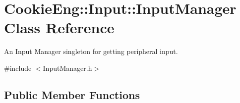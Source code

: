 \hypertarget{class_cookie_eng_1_1_input_1_1_input_manager}{}\section{Cookie\+Eng\+:\+:Input\+:\+:Input\+Manager Class Reference}
\label{class_cookie_eng_1_1_input_1_1_input_manager}


An Input Manager singleton for getting peripheral input.  




{\ttfamily \#include $<$Input\+Manager.\+h$>$}

\subsection*{Public Member Functions}
